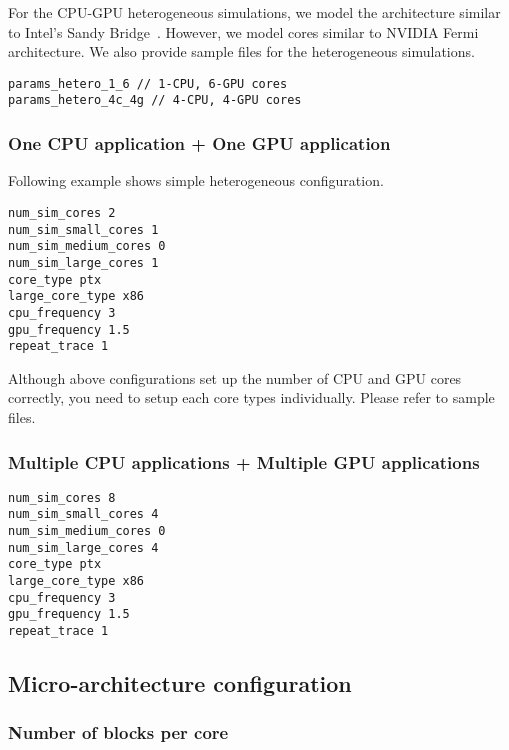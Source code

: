 For the CPU-GPU heterogeneous simulations, we model the architecture
similar to Intel's Sandy Bridge~\cite{sandybridge}. However, we
model \gpu cores similar to NVIDIA Fermi~\cite{fermi} architecture. We
also provide sample files for the heterogeneous simulations.

\smallskip
\begin{lstlisting}
params_hetero_1_6 // 1-CPU, 6-GPU cores
params_hetero_4c_4g // 4-CPU, 4-GPU cores
\end{lstlisting}
\smallskip

\subsubsection{One CPU application + One GPU application}

Following example shows simple heterogeneous configuration.

\smallskip
\begin{lstlisting}
num_sim_cores 2
num_sim_small_cores 1
num_sim_medium_cores 0
num_sim_large_cores 1
core_type ptx
large_core_type x86
cpu_frequency 3
gpu_frequency 1.5
repeat_trace 1
\end{lstlisting}
\smallskip

Although above configurations set up the number of CPU and GPU cores
correctly, you need to setup each core types individually. Please
refer to sample files.

\subsubsection{Multiple CPU applications + Multiple GPU applications}

\smallskip
\begin{lstlisting}
num_sim_cores 8
num_sim_small_cores 4
num_sim_medium_cores 0
num_sim_large_cores 4
core_type ptx
large_core_type x86
cpu_frequency 3
gpu_frequency 1.5
repeat_trace 1
\end{lstlisting}
\smallskip


\subsection{Micro-architecture configuration}

\subsubsection{Number of blocks per core}

